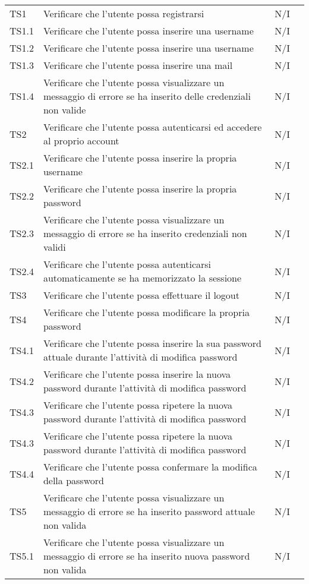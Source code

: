 {\begin{longtable}{C{.115\freewidth} C{.257\freewidth} C{.26\freewidth} C{.4\freewidth}}
    TS1 & Verificare che l’utente possa registrarsi & N/I  &\\ 
    TS1.1 &Verificare che l’utente possa inserire una username & N/I  &\\
    TS1.2 & Verificare che l’utente possa inserire una username & N/I  &\\
    TS1.3 & Verificare che l’utente possa inserire una mail & N/I  &\\
    TS1.4 & Verificare che l’utente possa visualizzare un messaggio di errore se ha inserito delle credenziali non valide & N/I  &\\
    TS2 & Verificare che l’utente possa autenticarsi ed accedere al proprio account & N/I  &\\
    TS2.1 & Verificare che l’utente possa inserire la propria username & N/I  &\\
    TS2.2 & Verificare che l’utente possa inserire la propria password & N/I  &\\
    TS2.3 & Verificare che l’utente possa visualizzare un messaggio di errore se ha inserito credenziali non validi & N/I  &\\
    TS2.4 & Verificare che l’utente possa autenticarsi automaticamente se ha memorizzato la sessione    & N/I  &\\
    TS3 & Verificare che l’utente possa effettuare il logout & N/I  &\\
    TS4 & Verificare che l’utente possa modificare la propria password & N/I  &\\
    TS4.1 & Verificare che l’utente possa inserire la sua password attuale durante l’attività di modifica password & N/I  &\\
    TS4.2 & Verificare che l’utente possa inserire la nuova password durante l’attività di modifica password & N/I  &\\
    TS4.3 & Verificare che l’utente possa ripetere la nuova password durante l’attività di modifica password & N/I  &\\
    TS4.3 & Verificare che l’utente possa ripetere la nuova password durante l’attività di modifica password& N/I  &\\
    TS4.4 & Verificare che l’utente possa confermare la modifica della password & N/I  &\\
    TS5 & Verificare che l’utente possa visualizzare un messaggio di errore se ha inserito password attuale  non valida & N/I  &\\
    TS5.1 & Verificare che l’utente possa visualizzare un messaggio di errore se ha inserito nuova password non valida & N/I  &\\

\end{longtable}}
